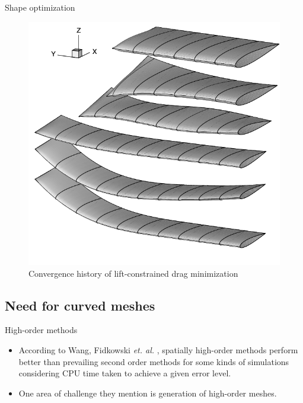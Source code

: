 \documentclass[t,12pt]{beamer}
\begin{document}
\begin{frame}{Shape optimization}
	\begin{figure}
		\includegraphics[scale=0.2]{ppt-illus-shapeoptimization}
		\caption{Convergence history of lift-constrained drag minimization }
	\end{figure}
\end{frame}

\subsection{Need for curved meshes}
\begin{frame}{High-order methods}
\begin{itemize}
  \item According to Wang, Fidkowski \emph{et. al.} , spatially high-order methods perform better than prevailing second order methods for some kinds of simulations considering CPU time taken to achieve a given error level.
  \item One area of challenge they mention is generation of high-order meshes.
\end{itemize}
\end{frame}
\end{document}

